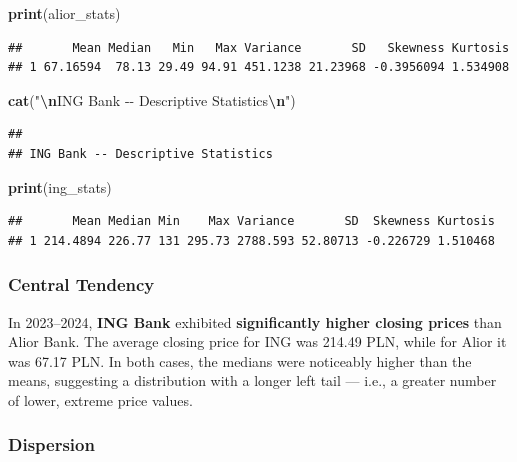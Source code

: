 \documentclass[
]{article}
\newenvironment{Shaded}{\begin{snugshade}}{\end{snugshade}}
\newcommand{\FunctionTok}[1]{\textcolor[rgb]{0.13,0.29,0.53}{\textbf{#1}}}
\newcommand{\NormalTok}[1]{#1}
\newcommand{\SpecialCharTok}[1]{\textcolor[rgb]{0.81,0.36,0.00}{\textbf{#1}}}
\newcommand{\StringTok}[1]{\textcolor[rgb]{0.31,0.60,0.02}{#1}}
\begin{document}
\begin{Shaded}
\begin{Highlighting}[]
\FunctionTok{print}\NormalTok{(alior\_stats)}
\end{Highlighting}
\end{Shaded}

\begin{verbatim}
##       Mean Median   Min   Max Variance       SD   Skewness Kurtosis
## 1 67.16594  78.13 29.49 94.91 451.1238 21.23968 -0.3956094 1.534908
\end{verbatim}

\begin{Shaded}
\begin{Highlighting}[]
\FunctionTok{cat}\NormalTok{(}\StringTok{"}\SpecialCharTok{\textbackslash{}n}\StringTok{ING Bank {-}{-} Descriptive Statistics}\SpecialCharTok{\textbackslash{}n}\StringTok{"}\NormalTok{)}
\end{Highlighting}
\end{Shaded}

\begin{verbatim}
## 
## ING Bank -- Descriptive Statistics
\end{verbatim}

\begin{Shaded}
\begin{Highlighting}[]
\FunctionTok{print}\NormalTok{(ing\_stats)}
\end{Highlighting}
\end{Shaded}

\begin{verbatim}
##       Mean Median Min    Max Variance       SD  Skewness Kurtosis
## 1 214.4894 226.77 131 295.73 2788.593 52.80713 -0.226729 1.510468
\end{verbatim}

\subsubsection{Central Tendency}\label{central-tendency}

In 2023--2024, \textbf{ING Bank} exhibited \textbf{significantly higher
closing prices} than Alior Bank. The average closing price for ING was
214.49 PLN, while for Alior it was 67.17 PLN. In both cases, the medians
were noticeably higher than the means, suggesting a distribution with a
longer left tail --- i.e., a greater number of lower, extreme price
values.

\subsubsection{Dispersion}\label{dispersion}
\end{document}
